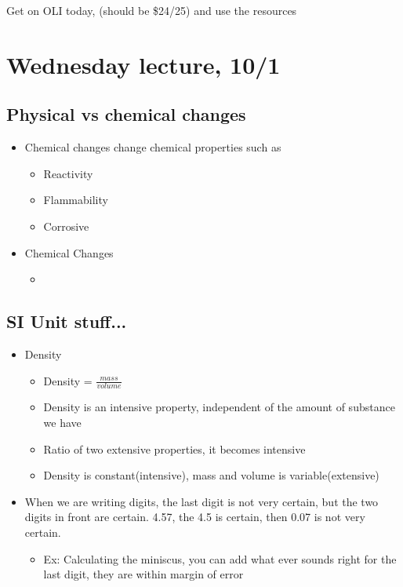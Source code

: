 \documentclass{article}
\begin{document}
Get on OLI today, (should be \$24/25) and use the resources

\section{Wednesday lecture, 10/1}

\subsection{Physical vs chemical changes}
\begin{itemize}
  \item Chemical changes change chemical properties such as
    \begin{itemize}
      \item Reactivity
      \item Flammability
      \item Corrosive
    \end{itemize}
  \item Chemical Changes
    \begin{itemize}
      \item
    \end{itemize}
\end{itemize}


\subsection{SI Unit stuff...}
\begin{itemize}
  \item Density
    \begin{itemize}
      \item Density = $\frac{mass}{volume} $
      \item Density is an intensive property, independent of the amount of substance we have
      \item Ratio of two extensive properties, it becomes intensive
      \item Density is constant(intensive), mass and volume is variable(extensive)
    \end{itemize}
  \item When we are writing digits, the last digit is not very certain, but the two digits in front
    are certain. 4.57, the 4.5 is certain, then 0.07 is not very certain.
    \begin{itemize}
      \item Ex: Calculating the miniscus, you can add what ever sounds right for the last digit,
        they are within margin of error
    \end{itemize}
\end{itemize}
\end{document}
